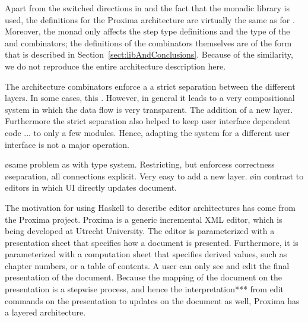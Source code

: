 \documentclass[preprint,natbib]{sigplanconf}
\begin{document}
Apart from the switched directions in  and the fact that the monadic library is used, the definitions for the Proxima architecture are virtually the same as for . Moreover, the monad only affects the step type definitions and the type of the  and  combinators; the definitions of the combinators themselves are of the form that is described in Section~\ref{sect:libAndConclusions}. Because of the similarity, we do not reproduce the entire architecture description here.

\bc
\bigskip

The architecture combinators enforce a a strict separation between the different layers. In some cases, this . However, in general it leads to a very compositional system in which the data flow is very transparent. The addition of a new layer. Furthermore the strict separation also helped to keep user interface dependent code ... to only a few modules. Hence, adapting the system for a different user interface is not a major operation.

\bl
\o same problem as with type system. Restricting, but enforcess correctness
\o separation, all connections explicit. Very easy to add a new layer. 
\o in contrast to editors in which UI directly updates document.
\el
\ec

\bc
The motivation for using Haskell to describe editor architectures has come from the Proxima project. Proxima is a generic incremental XML editor, which is being developed at Utrecht University. The editor is parameterized with a presentation sheet that specifies how a document is presented. Furthermore, it is parameterized with a computation sheet that specifies derived values, such as chapter numbers, or a table of contents. A user can only see and edit the final presentation of the document. Because the mapping of the document on the presentation is a stepwise process, and hence the interpretation*** from edit commands on the presentation to updates on the document as well, Proxima has a layered architecture.
\ec
\end{document}
